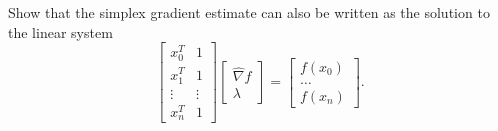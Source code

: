 \documentclass[12pt, leqno]{article}
\begin{document}

Show that the simplex gradient estimate can also be written as the
solution to the linear system
\[
  \begin{bmatrix}
    x_0^T & 1 \\
    x_1^T & 1 \\
    \vdots & \vdots \\
    x_n^T & 1
  \end{bmatrix}
  \begin{bmatrix} \hat{\nabla} f \\ \lambda \end{bmatrix} =
  \begin{bmatrix} f(x_0) \\ \ldots \\ f(x_n) \end{bmatrix}.
\]
\end{document}
